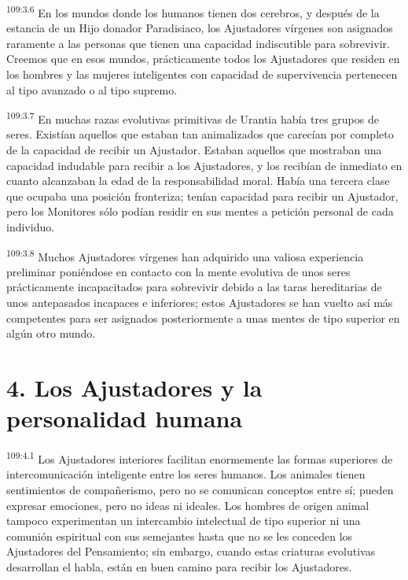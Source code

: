 \documentclass[twoside, 11pt]{book}
\begin{document}
\par
\textsuperscript{109:3.6} En los mundos donde los humanos tienen dos cerebros, y después de la estancia de un Hijo donador Paradisiaco, los Ajustadores vírgenes son asignados raramente a las personas que tienen una capacidad indiscutible para sobrevivir. Creemos que en esos mundos, prácticamente todos los Ajustadores que residen en los hombres y las mujeres inteligentes con capacidad de supervivencia pertenecen al tipo avanzado o al tipo supremo.

\par
\textsuperscript{109:3.7} En muchas razas evolutivas primitivas de Urantia había tres grupos de seres. Existían aquellos que estaban tan animalizados que carecían por completo de la capacidad de recibir un Ajustador. Estaban aquellos que mostraban una capacidad indudable para recibir a los Ajustadores, y los recibían de inmediato en cuanto alcanzaban la edad de la responsabilidad moral. Había una tercera clase que ocupaba una posición fronteriza; tenían capacidad para recibir un Ajustador, pero los Monitores sólo podían residir en sus mentes a petición personal de cada individuo.

\par
\textsuperscript{109:3.8} Muchos Ajustadores vírgenes han adquirido una valiosa experiencia preliminar poniéndose en contacto con la mente evolutiva de unos seres prácticamente incapacitados para sobrevivir debido a las taras hereditarias de unos antepasados incapaces e inferiores; estos Ajustadores se han vuelto así más competentes para ser asignados posteriormente a unas mentes de tipo superior en algún otro mundo.

\section*{4. Los Ajustadores y la personalidad humana}
\par
\textsuperscript{109:4.1} Los Ajustadores interiores facilitan enormemente las formas superiores de intercomunicación inteligente entre los seres humanos. Los animales tienen sentimientos de compañerismo, pero no se comunican conceptos entre sí; pueden expresar emociones, pero no ideas ni ideales. Los hombres de origen animal tampoco experimentan un intercambio intelectual de tipo superior ni una comunión espiritual con sus semejantes hasta que no se les conceden los Ajustadores del Pensamiento; sin embargo, cuando estas criaturas evolutivas desarrollan el habla, están en buen camino para recibir los Ajustadores.
\end{document}

